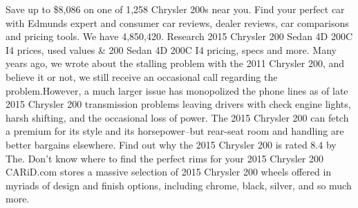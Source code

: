 \begin{tcolorbox}[colback=gray!20, colframe=gray!75, rounded corners, sharp corners=northeast, sharp corners=southwest]
{Save up to \$8,086 on one of 1,258 Chrysler 200s near you. Find your perfect car with Edmunds expert and consumer car reviews, dealer reviews, car comparisons and pricing tools. We have 4,850,420. Research 2015 Chrysler 200 Sedan 4D 200C I4 prices, used values \& 200 Sedan 4D 200C I4 pricing, specs and more. Many years ago, we wrote about the stalling problem with the 2011 Chrysler 200, and believe it or not, we still receive an occasional call regarding the problem.However, a much larger issue has monopolized the phone lines as of late 2015 Chrysler 200 transmission problems leaving drivers with check engine lights, harsh shifting, and the occasional loss of power. The 2015 Chrysler 200 can fetch a premium for its style and its horsepower--but rear-seat room and handling are better bargains elsewhere. Find out why the 2015 Chrysler 200 is rated 8.4 by The. Don't know where to find the perfect rims for your 2015 Chrysler 200 CARiD.com stores a massive selection of 2015 Chrysler 200 wheels offered in myriads of design and finish options, including chrome, black, silver, and so much more.}
\end{tcolorbox}

\clearpage


